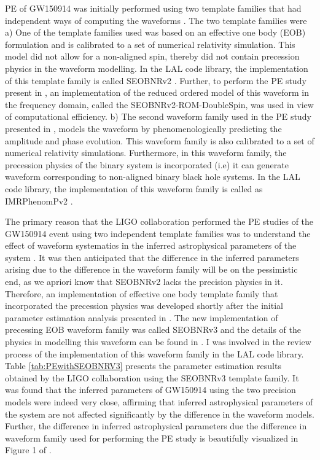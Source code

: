 PE of GW150914 was initially performed using two template families that had independent ways of computing the waveforms \cite{gw150914PE}. The two template families were a) One of the template families used was based on an effective one body (EOB) formulation and is calibrated to a set of numerical relativity simulation. This model did not allow for a non-aligned spin, thereby did not contain precession physics in the waveform modelling. In the LAL code library, the implementation of this template family is called SEOBNRv2  \cite{SEOBNRv2}.  Further,  to perform the PE study present in \cite{}, an implementation of the reduced ordered model of this waveform in the frequency domain, called the SEOBNRv2-ROM-DoubleSpin,  was used in view of computational efficiency.  b) The second waveform family used in the PE study presented in \cite{gw150914PE}, models the waveform by phenomenologically predicting the amplitude and phase evolution.  This waveform family is also calibrated to a set of numerical relativity simulations. Furthermore, in this waveform family, the precession physics of the binary system is incorporated (i.e) it can generate waveform corresponding to non-aligned binary black hole systems.  In the LAL code library,  the implementation of this waveform family is called as IMRPhenomPv2  \cite{IMRPhenomPv2}. 

The primary reason that the LIGO collaboration performed the PE studies of the GW150914 event using two independent template families was to understand the effect of waveform systematics in the inferred astrophysical parameters of the system \cite{gw150914PE}. It was then anticipated that the difference in the inferred parameters arising due to the difference in the waveform family will be on the pessimistic end, as we apriori know that SEOBNRv2 lacks the precision physics in it. Therefore, an implementation of effective one body template family that incorporated the precession physics was developed shortly after the initial parameter estimation analysis presented in \cite{gw150914PEseobnrv3}. The new implementation of precessing EOB waveform family was called SEOBNRv3  and the details of the physics in modelling this waveform can be found in \cite{SEOBNRv3}. I was involved in the review process of the implementation of this waveform family in the LAL code library.  Table \ref{tab:PEwithSEOBNRV3} presents the parameter estimation results obtained by the LIGO collaboration using the SEOBNRv3 template family. It was found that the inferred parameters of GW150914 using the two precision models were indeed very close, affirming that inferred astrophysical parameters of the system are not affected significantly by the difference in the waveform models. Further, the difference in inferred astrophysical parameters due the difference in waveform family used for performing the PE study is beautifully visualized in Figure 1 of \cite{gw150914PEseobnrv3}. 

